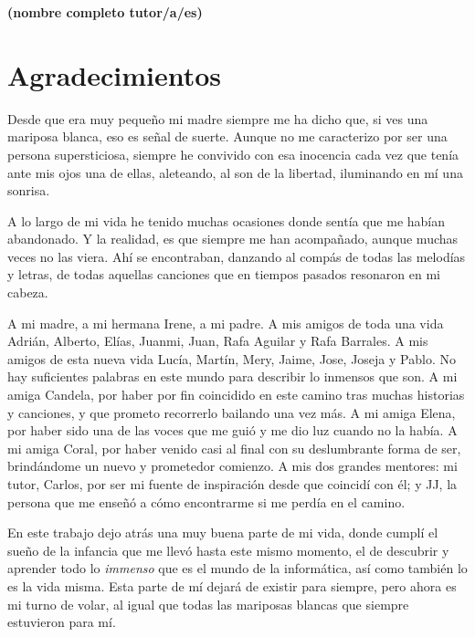 \vspace{5cm}

\noindent \textbf{(nombre completo tutor/a/es)}

\chapter*{Agradecimientos}

Desde que era muy pequeño mi madre siempre me ha dicho que, si ves una mariposa blanca, eso es señal de suerte. Aunque no me caracterizo por ser una persona supersticiosa, siempre he convivido con esa inocencia cada vez que tenía ante mis ojos una de ellas, aleteando, al son de la libertad, iluminando en mí una sonrisa.

\vspace{0.2cm}

A lo largo de mi vida he tenido muchas ocasiones donde sentía que me habían abandonado. Y la realidad, es que siempre me han acompañado, aunque muchas veces no las viera. Ahí se encontraban, danzando al compás de todas las melodías y letras, de todas aquellas canciones que en tiempos pasados resonaron en mi cabeza.

\vspace{0.2cm} 

A mi madre, a mi hermana Irene, a mi padre. A mis amigos de toda una vida Adrián, Alberto, Elías, Juanmi, Juan, Rafa Aguilar y Rafa Barrales. A mis amigos de esta nueva vida Lucía, Martín, Mery, Jaime, Jose, Joseja y Pablo. No hay suficientes palabras en este mundo para describir lo inmensos que son. A mi amiga Candela, por haber por fin coincidido en este camino tras muchas historias y canciones, y que prometo recorrerlo bailando una vez más. A mi amiga Elena, por haber sido una de las voces que me guió y me dio luz cuando no la había. A mi amiga Coral, por haber venido casi al final con su deslumbrante forma de ser, brindándome un nuevo y prometedor comienzo. A mis dos grandes mentores: mi tutor, Carlos, por ser mi fuente de inspiración desde que coincidí con él; y JJ, la persona que me enseñó a cómo encontrarme si me perdía en el camino.

\vspace{0.2cm}
En este trabajo dejo atrás una muy buena parte de mi vida, donde cumplí el sueño de la infancia que me llevó hasta este mismo momento, el de descubrir y aprender todo lo \textit{immenso} que es el mundo de la informática, así como también lo es la vida misma. Esta parte de mí dejará de existir para siempre, pero ahora es mi turno de volar, al igual que todas las mariposas blancas que siempre estuvieron para mí.

